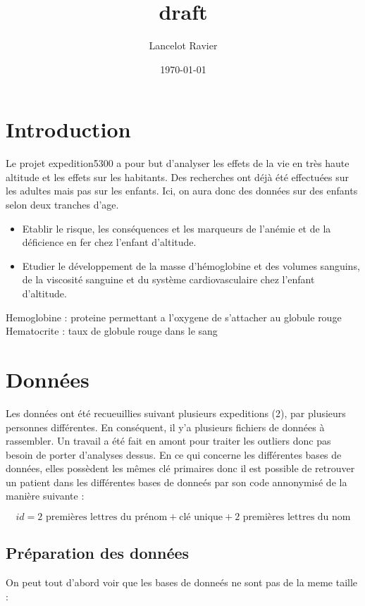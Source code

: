 \documentclass[a4paper,12pt]{article}
\title{draft}   %
\author{Lancelot Ravier}  %
\date{\today}    %
\begin{document}
\maketitle

\section{Introduction}

Le projet expedition5300 a pour but d'analyser les effets de la vie en très haute altitude et les effets sur les habitants. Des recherches ont déjà été effectuées sur les adultes mais pas sur les enfants. Ici, on aura donc des données sur des enfants selon deux tranches d'age.

\begin{itemize}
    \item Etablir le risque, les conséquences et les
    marqueurs de l’anémie et de la déficience en fer chez l’enfant
    d’altitude.
    \item Etudier le développement de la masse
    d’hémoglobine et des volumes sanguins, de la viscosité sanguine et
    du système cardiovasculaire chez l’enfant d’altitude.
\end{itemize}

Hemoglobine : proteine permettant a l'oxygene de s'attacher au globule rouge
Hematocrite : taux de globule rouge dans le sang
\section{Données}

Les données ont été recueuillies suivant plusieurs expeditions (2), par plusieurs personnes différentes. En conséquent, il y'a plusieurs fichiers de données à rassembler. Un travail a été fait en amont pour traiter les outliers donc pas besoin de porter d'analyses dessus. En ce qui concerne les différentes bases de données, elles possèdent les mêmes clé primaires donc il est possible de retrouver un patient dans les différentes bases de donneés par son code annonymisé de la manière suivante : 

$$ id = \text{2 premières lettres du prénom} + \text{clé unique} + \text{2 premières lettres du nom}$$

\subsection{Préparation des données}

On peut tout d'abord voir que les bases de donneés ne sont pas de la meme taille :
\end{document}
